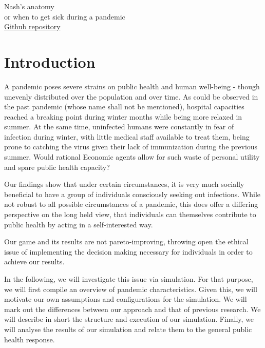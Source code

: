 \documentclass[]{article}
\begin{document}
\pagestyle{fancy}

\begin{center}
    \LARGE{Nash's anatomy\\}
    \large{or when to get sick during a pandemic\\}
    \small{\href{https://github.com/sbackmann/game-theory-controversies}{Github repository}}
\end{center}


\section{Introduction}
A pandemic poses severe strains on public health and human well-being - though unevenly distributed over the population and over time. As could be observed in the past pandemic (whose name shall not be mentioned), hospital capacities reached a breaking point during winter months while being more relaxed in summer. At the same time, uninfected humans were constantly in fear of infection during winter, with little medical staff available to treat them, being prone to catching the virus given their lack of immunization during the previous summer. Would rational Economic agents allow for such waste of personal utility and spare public health capacity? 

Our findings show that under certain circumstances, it is very much socially beneficial to have a group of individuals consciously seeking out infections. While not robust to all possible circumstances of a pandemic, this does offer a differing perspective on the long held view, that individuals can themselves contribute to public health by acting in a self-interested way. 

Our game and its results are not pareto-improving, throwing open the ethical issue of implementing the decision making necessary for individuals in order to achieve our results. 

In the following, we will investigate this issue via simulation. For that purpose, we will first compile an overview of pandemic characteristics. Given this, we will motivate our own assumptions and configurations for the simulation. We will mark out the differences between our approach and that of previous research. We will describe in short the structure and execution of our simulation. Finally, we will analyse the results of our simulation and relate them to the general public health response. 
\end{document}
